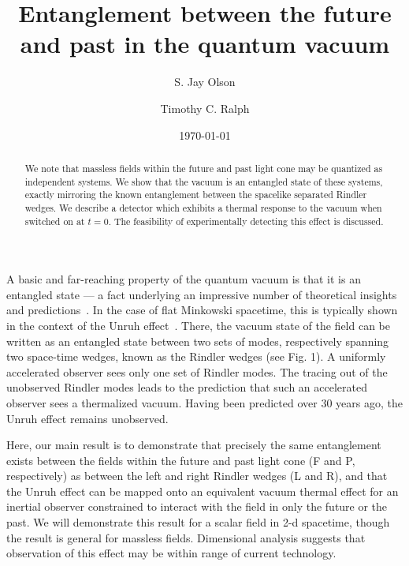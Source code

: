 \documentclass[aps,prl,twocolumn,showpacs]{revtex4}
\begin{document}


\title{Entanglement between the future and past in the quantum vacuum}

\author{S. Jay Olson}
 \author{Timothy C. Ralph}

\date{\today}

\begin{abstract}
We note that massless fields within the future and past light cone may be quantized as independent systems.  We show that the vacuum is an entangled state of these systems, exactly mirroring the known entanglement between the spacelike separated Rindler wedges.   We describe a detector which exhibits a thermal response to the vacuum when switched on at $t=0$.  The feasibility of experimentally detecting this effect is discussed.

\end{abstract}

\maketitle

A basic and far-reaching property of the quantum vacuum is that it is an entangled state \---- a fact underlying an impressive number of theoretical insights and predictions~\cite{birrell1}.  In the case of flat Minkowski spacetime, this is typically shown in the context of the Unruh effect~\cite{unruh1, crispino1}.  There, the vacuum state of the field can be written as an entangled state between two sets of modes, respectively spanning two space-time wedges, known as the Rindler wedges (see Fig. 1).  A uniformly accelerated observer sees only one set of Rindler modes.  The tracing out of the unobserved Rindler modes leads to the prediction that such an accelerated observer sees a thermalized vacuum.  Having been predicted over 30 years ago, the Unruh effect remains unobserved.

Here, our main result is to demonstrate that precisely the same entanglement exists between the fields within the future and past light cone (F and P, respectively) as between the left and right Rindler wedges (L and R), and that the Unruh effect can be mapped onto an equivalent vacuum thermal effect for an inertial observer constrained to interact with the field in only the future or the past.  We will demonstrate this result for a scalar field in 2-d spacetime, though the result is general for massless fields.  Dimensional analysis suggests that observation of this effect may be within range of current technology.
\end{document}

